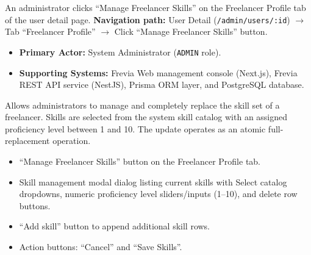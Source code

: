 An administrator clicks ``Manage Freelancer Skills'' on the Freelancer Profile tab of the user detail page.\newline
\textbf{Navigation path:} User Detail (\texttt{/admin/users/:id}) $\rightarrow$ Tab ``Freelancer Profile'' $\rightarrow$ Click ``Manage Freelancer Skills'' button.


\begin{itemize}[leftmargin=1.6em,topsep=3pt,itemsep=2pt,parsep=0pt,label=$\bullet$]
    \item \textbf{Primary Actor:} System Administrator (\texttt{ADMIN} role).
    \item \textbf{Supporting Systems:} Frevia Web management console (Next.js), Frevia REST API service (NestJS), Prisma ORM layer, and PostgreSQL database.
\end{itemize}

\noindent Allows administrators to manage and completely replace the skill set of a freelancer. Skills are selected from the system skill catalog with an assigned proficiency level between 1 and 10. The update operates as an atomic full-replacement operation.

\begin{itemize}[leftmargin=1.6em,topsep=3pt,itemsep=2pt,parsep=0pt,label=$\bullet$]
    \item ``Manage Freelancer Skills'' button on the Freelancer Profile tab.
    \item Skill management modal dialog listing current skills with Select catalog dropdowns, numeric proficiency level sliders/inputs (1--10), and delete row buttons.
    \item ``Add skill'' button to append additional skill rows.
    \item Action buttons: ``Cancel'' and ``Save Skills''.
\end{itemize}

